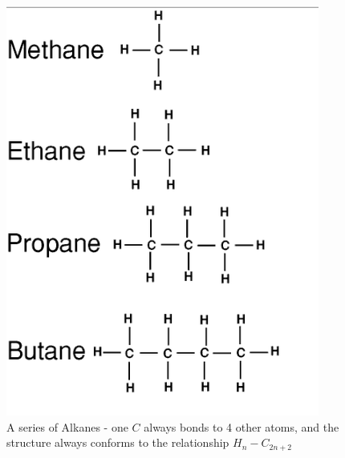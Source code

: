 \documentclass[a4paper,10pt]{report}
\begin{document}
\begin{figure}[h!]
	\begin{centering}
	\begin{center}
	\includegraphics[width=\linewidth]{./alkanes.png}
	\caption{A series of Alkanes -  one $C$ always bonds to 4 other atoms, and the structure always conforms to the relationship $H_n-C_{2n+2}$}
	\label{fig:alkanes}
	\end{center}
	\par\end{centering}
\end{figure}
\end{document}
